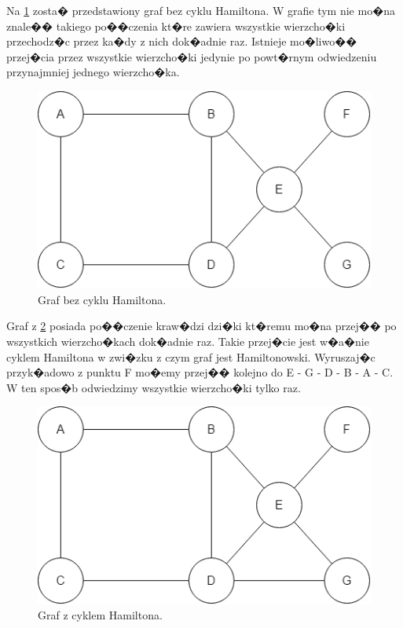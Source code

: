 Na \ref{kl_graf_nie_hamiltona} zosta� przedstawiony graf bez cyklu Hamiltona. W grafie tym nie mo�na znale�� takiego po��czenia kt�re zawiera wszystkie wierzcho�ki przechodz�c przez ka�dy z nich dok�adnie raz. Istnieje mo�liwo�� przej�cia przez wszystkie wierzcho�ki jedynie po powt�rnym odwiedzeniu przynajmniej jednego wierzcho�ka.

\begin{figure}[h!]
	\centering
	\includegraphics[scale=0.75]{grafika/kl_graf_nie_hamiltona.png}
	\caption{Graf bez cyklu Hamiltona.}
	\label{kl_graf_nie_hamiltona}
\end{figure}

Graf z \ref{kl_graf_hamiltona} posiada po��czenie kraw�dzi dzi�ki kt�remu mo�na przej�� po wszystkich wierzcho�kach dok�adnie raz. Takie przej�cie jest w�a�nie cyklem Hamiltona w zwi�zku z czym graf jest Hamiltonowski. Wyruszaj�c przyk�adowo z punktu F mo�emy przej�� kolejno do E - G - D - B - A - C. W ten spos�b odwiedzimy wszystkie wierzcho�ki tylko raz. 

\begin{figure}[h]
	\centering
	\includegraphics[scale=0.75]{grafika/kl_graf_hamiltona.png}
	\caption{Graf z cyklem Hamiltona.}
	\label{kl_graf_hamiltona}
\end{figure}


